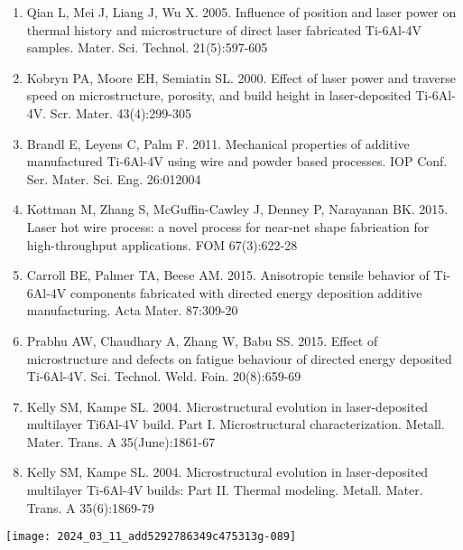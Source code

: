 \documentclass[10pt]{article}
\begin{document}
\begin{enumerate}
  \item Qian L, Mei J, Liang J, Wu X. 2005. Influence of position and laser power on thermal history and microstructure of direct laser fabricated Ti-6Al-4V samples. Mater. Sci. Technol. 21(5):597-605

  \item Kobryn PA, Moore EH, Semiatin SL. 2000. Effect of laser power and traverse speed on microstructure, porosity, and build height in laser-deposited Ti-6Al-4V. Scr. Mater. 43(4):299-305

  \item Brandl E, Leyens C, Palm F. 2011. Mechanical properties of additive manufactured Ti-6Al-4V using wire and powder based processes. IOP Conf. Ser. Mater. Sci. Eng. 26:012004

  \item Kottman M, Zhang S, McGuffin-Cawley J, Denney P, Narayanan BK. 2015. Laser hot wire process: a novel process for near-net shape fabrication for high-throughput applications. FOM 67(3):622-28

  \item Carroll BE, Palmer TA, Beese AM. 2015. Anisotropic tensile behavior of Ti-6Al-4V components fabricated with directed energy deposition additive manufacturing. Acta Mater. 87:309-20

  \item Prabhu AW, Chaudhary A, Zhang W, Babu SS. 2015. Effect of microstructure and defects on fatigue behaviour of directed energy deposited Ti-6Al-4V. Sci. Technol. Weld. Foin. 20(8):659-69

  \item Kelly SM, Kampe SL. 2004. Microstructural evolution in laser-deposited multilayer Ti6Al-4V build. Part I. Microstructural characterization. Metall. Mater. Trans. A 35(June):1861-67

  \item Kelly SM, Kampe SL. 2004. Microstructural evolution in laser-deposited multilayer Ti-6Al-4V builds: Part II. Thermal modeling. Metall. Mater. Trans. A 35(6):1869-79

\end{enumerate}

\begin{center}
\texttt{[image: 2024\_03\_11\_add5292786349c475313g-089]}
\end{center}
\end{document}
